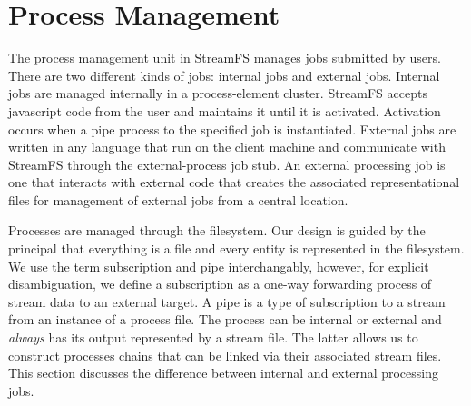 \section{Process Management}

The process management unit in StreamFS manages jobs submitted by users.  There are two different kinds of jobs: internal
jobs and external jobs.  Internal jobs are managed internally in a process-element cluster.  StreamFS accepts javascript code
from the user and maintains it until it is activated.  Activation occurs when a pipe process to the specified job
is instantiated.  External jobs are written in any language that run on the client machine and communicate with StreamFS
through the external-process job stub.  An external processing job
is one that interacts with external code that creates the associated representational files for management 
of external jobs from a central location.

Processes are managed through the filesystem.  Our design is guided by the principal that everything is a file and
every entity is represented in the filesystem.  We use the term subscription and pipe interchangably, however, for 
explicit disambiguation, we define a subscription as a one-way forwarding process of stream data to an external
target.  A pipe is a type of subscription to a stream from an instance of a process file.  The process can
be internal or external and \emph{always} has its output represented by a stream file.  The latter allows us
to construct processes chains that can be linked via their associated stream files.
This section discusses the difference between internal and external processing jobs.  

